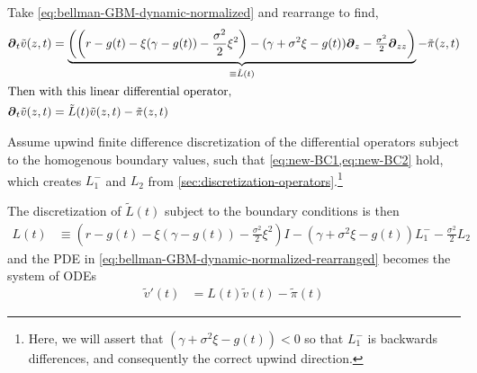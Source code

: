 \documentclass[11pt]{article}
\newcommand{\D}[1][]{\ensuremath{\boldsymbol{\partial}_{#1}}}
\newcommand{\R}{\ensuremath{\mathbb{R}}}
\begin{document}
Take \cref{eq:bellman-GBM-dynamic-normalized} and rearrange to find,
\begin{align}
	\D[t]\tilde{v}(z,t) &= \underbrace{\left(\left(r - g(t)- \xi(\gamma-g(t)) - \frac{\sigma^2}{2}\xi^2\right) - (\gamma + \sigma^2\xi - g(t)) \D[z] - \tfrac{\sigma^2}{2} \D[zz]\right)}_{\equiv \tilde{L}(t)} - \tilde{\pi}(z,t) \label{eq:bellman-GBM-dynamic-normalized-rearranged}\\
	\intertext{Then with this linear differential operator,}
	\D[t]\tilde{v}(z,t) &= \tilde{L}(t) \tilde{v}(z,t) - \tilde{\pi}(z,t)
\end{align}

Assume upwind finite difference discretization of the differential operators subject to the homogenous boundary values, such that \cref{eq:new-BC1,eq:new-BC2} hold, which creates $L^{-}_1$ and $L_2$ from \cref{sec:discretization-operators}.\footnote{Here, we will assert that $(\gamma + \sigma^2\xi - g(t)) < 0$ so that $L^{-}_1$ is backwards differences, and consequently the correct upwind direction.}

The discretization of $\tilde{L}(t)$ subject to the boundary conditions is then
\begin{align}
L(t) &\equiv \left(r - g(t)- \xi(\gamma-g(t)) - \frac{\sigma^2}{2}\xi^2\right) I - (\gamma + \sigma^2\xi - g(t)) L^{-}_1 - \tfrac{\sigma^2}{2} L_2
\end{align}
and the PDE in \cref{eq:bellman-GBM-dynamic-normalized-rearranged} becomes the system of ODEs
\begin{align}
	\tilde{v}'(t) &= L(t) \tilde{v}(t) - \tilde{\pi}(t)
\end{align}	


\end{document}
